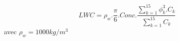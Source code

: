 \[
LWC = \rho_w .\frac{\pi}{6}. Conc .
\frac{\displaystyle\sum_{k=1}^{15} \phi^3_k.C_k}
     {\displaystyle\sum_{k=1}^{15} C_k}
\]
avec $\rho_w = 1000 kg/m^3$
